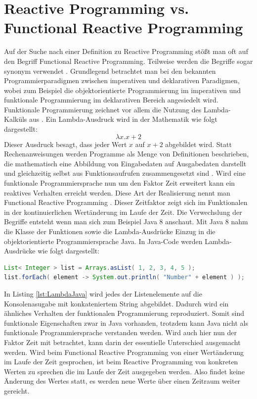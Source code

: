 \section{Reactive Programming vs. Functional Reactive Programming}
Auf der Suche nach einer Definition zu Reactive Programming stößt man oft auf den Begriff Functional Reactive Programming. Teilweise werden die Begriffe sogar synonym verwendet \cite{Nurkiewicz.2017}. Grundlegend betrachtet man bei den bekannten Programmierparadigmen zwischen imperativen und deklarativen Paradigmen, wobei zum Beispiel die objektorientierte Programmierung im imperativen und funktionale Programmierung im deklarativen Bereich angesiedelt wird. Funktionale Programmierung zeichnet vor allem die Nutzung des Lambda-Kalküls aus \cite{lamdakalk}. Ein Lambda-Ausdruck wird in der Mathematik wie folgt dargestellt:
\begin{displaymath}
\lambda x.x+2
\end{displaymath}
Dieser Ausdruck besagt, dass jeder Wert $x$ auf $x+2$ abgebildet wird.
Statt Rechenanweisungen werden Programme als Menge von Definitionen beschrieben, die mathematisch eine Abbildung von Eingabedaten auf Ausgabedaten darstellt und gleichzeitig selbst aus Funktionsaufrufen zusammengesetzt sind \cite{fpwiki}. Wird eine funktionale Programmiersprache nun um den Faktor Zeit erweitert kann ein reaktives Verhalten erreicht werden. Diese Art der Realisierung nennt man Functional Reactive Programming \cite{hsklwiki}. Dieser Zeitfaktor zeigt sich im Funktionalen in der kontinuierlichen Wertänderung im Laufe der Zeit. Die Verwechslung der Begriffe entsteht wenn man sich zum Beispiel Java 8 anschaut. Mit Java 8 nahm die Klasse der Funktionen sowie die Lambda-Ausdrücke Einzug in die objektorientierte Programmiersprache Java. In Java-Code werden Lambda-Ausdrücke wie folgt dargestellt:
\begin{lstlisting}[language=java, caption={Lambda Beispiel in Java}, float=hbt, label=lst:LambdaJava, frame=single]
List< Integer > list = Arrays.asList( 1, 2, 3, 4, 5 );
list.forEach( element -> System.out.println( "Number" + element ) );
\end{lstlisting}
In Listing \ref{lst:LambdaJava} wird jedes der Listenelemente auf die Konsolenasugabe mit konkateniertem String abgebildet. Dadurch wird ein ähnliches Verhalten der funktionalen Programmierung reproduziert. Somit sind funktionale Eigenschaften zwar in Java vorhanden, trotzdem kann Java nicht als funktionale Programmiersprache verstanden werden. Wird auch hier nun der Faktor Zeit mit betrachtet, kann darin der essentielle Unterschied ausgemacht werden. Wird beim Functional Reactive Programming von einer Wertänderung im Laufe der Zeit gesprochen, ist beim Reactive Programming von konkreten Werten zu sprechen die im Laufe der Zeit ausgegeben werden. Also findet keine Änderung des Wertes statt, es werden neue Werte über einen Zeitraum weiter gereicht. 